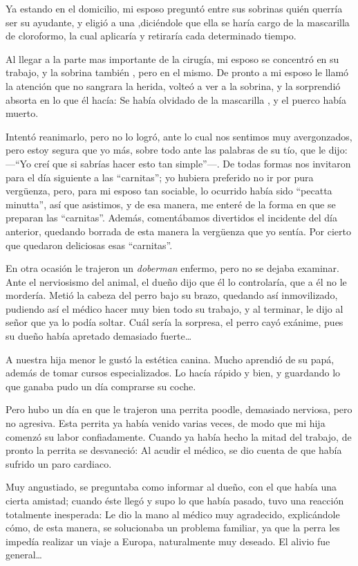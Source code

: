 \documentclass[letterpaper, 12pt]{book}
\begin{document}
Ya estando en el domicilio, mi esposo preguntó entre sus sobrinas quién querría ser su ayudante, y eligió a una ,diciéndole que ella se haría cargo  de la mascarilla de cloroformo, la cual aplicaría y retiraría cada determinado tiempo.

Al llegar a la parte mas importante de la cirugía, mi esposo se concentró en su trabajo, y la sobrina también , pero en el mismo. De pronto a mi esposo le llamó la atención que no sangrara la herida, volteó a ver a la sobrina, y la sorprendió absorta en lo que él hacía: Se había olvidado de la mascarilla , y el puerco había muerto.

Intentó reanimarlo, pero no lo logró, ante lo cual nos sentimos muy avergonzados, pero estoy segura que yo más, sobre todo ante las palabras de su tío, que le dijo: ---``Yo creí que si sabrías hacer esto tan simple''---. De todas formas nos invitaron para el día siguiente a las ``carnitas''; yo hubiera preferido no ir por pura vergüenza, pero, para mi esposo tan sociable, lo ocurrido había sido ``pecatta minutta'', así que asistimos, y de esa manera, me enteré de la forma en que se preparan las ``carnitas''. Además, comentábamos divertidos el incidente del día anterior, quedando borrada de esta manera la vergüenza que yo sentía. Por cierto que quedaron deliciosas esas ``carnitas''.

En otra ocasión le trajeron un {\it doberman} enfermo, pero no se dejaba examinar. Ante el nerviosismo del animal, el dueño dijo que él lo controlaría, que a él no le mordería. Metió la cabeza del perro bajo su brazo, quedando así inmovilizado, pudiendo así el médico hacer muy bien todo su trabajo, y al terminar, le dijo al señor que ya lo podía soltar. Cuál sería la sorpresa, el perro cayó exánime, pues su dueño había apretado demasiado fuerte\ldots


A nuestra hija menor le gustó la estética canina. Mucho aprendió de su papá, además de tomar cursos especializados. Lo hacía rápido y bien, y guardando lo que ganaba pudo un día comprarse su coche.

Pero hubo un día en que le trajeron una perrita poodle, demasiado nerviosa, pero no agresiva. Esta perrita ya había venido varias veces, de modo que mi hija comenzó su labor confiadamente. Cuando ya había hecho la mitad del trabajo, de pronto la perrita se desvaneció: Al acudir el médico, se dio cuenta de que había sufrido un paro cardiaco. 

Muy angustiado, se preguntaba como informar al dueño, con el que había una cierta amistad; cuando éste llegó y supo lo que había pasado, tuvo una reacción totalmente inesperada: Le dio la mano al médico muy agradecido, explicándole cómo, de esta manera, se solucionaba un problema familiar, ya que la perra les impedía realizar un viaje a Europa, naturalmente muy deseado. El alivio fue general\ldots
\end{document}
